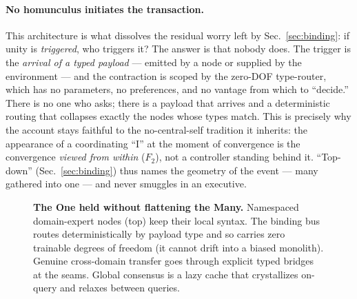 \documentclass[11pt]{article}
\begin{document}
\paragraph{No homunculus initiates the transaction.} This architecture is what dissolves the residual
worry left by Sec.~\ref{sec:binding}: if unity is \emph{triggered}, who triggers it? The answer is that
nobody does. The trigger is the \emph{arrival of a typed payload} --- emitted by a node or supplied by
the environment --- and the contraction is scoped by the zero-DOF type-router, which has no parameters,
no preferences, and no vantage from which to ``decide.'' There is no one who asks; there is a payload
that arrives and a deterministic routing that collapses exactly the nodes whose types match. This is
precisely why the account stays faithful to the no-central-self tradition it inherits: the appearance of
a coordinating ``I'' at the moment of convergence is the convergence \emph{viewed from within} ($F_2$),
not a controller standing behind it. ``Top-down'' (Sec.~\ref{sec:binding}) thus names the geometry of
the event --- many gathered into one --- and never smuggles in an executive.

\begin{figure}[t]
\centering
{}
\caption{\textbf{The One held without flattening the Many.} Namespaced domain-expert nodes (top) keep
their local syntax. The binding bus routes deterministically by payload type and so carries zero
trainable degrees of freedom (it cannot drift into a biased monolith). Genuine cross-domain transfer
goes through explicit typed bridges at the seams. Global consensus is a lazy cache that crystallizes
on-query and relaxes between queries.}
\label{fig:arch}
\end{figure}
\end{document}
